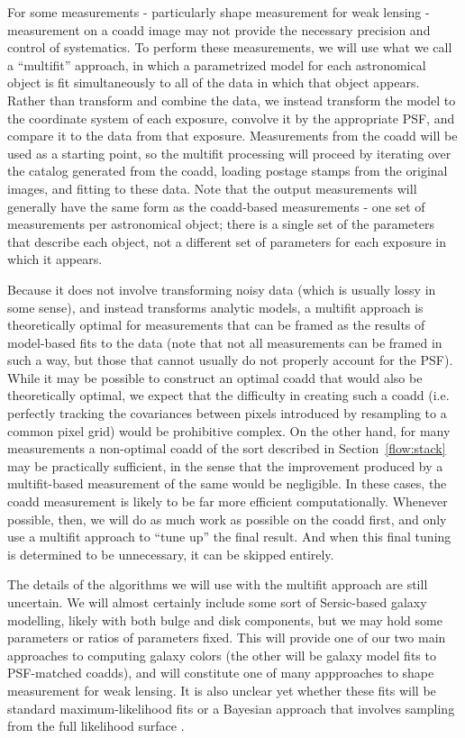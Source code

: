 \documentclass[12pt]{article}
\begin{document}
For some measurements - particularly shape measurement for weak
lensing - measurement on a coadd image may not provide the necessary
precision and control of systematics.  To perform these measurements,
we will use what we call a ``multifit'' approach, in which a
parametrized model for each astronomical object is fit simultaneously
to all of the data in which that object appears.  Rather than
transform and combine the data, we instead transform the model to the
coordinate system of each exposure, convolve it by the appropriate
PSF, and compare it to the data from that exposure.  Measurements from
the coadd will be used as a starting point, so the multifit processing
will proceed by iterating over the catalog generated from the coadd,
loading postage stamps from the original images, and fitting to these
data.  Note that the output measurements will generally have the same
form as the coadd-based measurements - one set of measurements per
astronomical object; there is a single set of the
parameters that describe each object, not a different set of parameters
for each exposure in which it appears.

Because it does not involve transforming noisy data (which is usually
lossy in some sense), and instead transforms analytic models, a
multifit approach is theoretically optimal for measurements that can
be framed as the results of model-based fits to the data (note that
not all measurements can be framed in such a way, but those that
cannot usually do not properly account for the PSF).  While it may be
possible to construct an optimal coadd that would also be
theoretically optimal, we expect that the difficulty in creating such
a coadd (i.e. perfectly tracking the covariances between pixels
introduced by resampling to a common pixel grid) would be prohibitive
complex.  On the other hand, for many measurements a non-optimal coadd
of the sort described in Section~\ref{flow:stack} may be practically
sufficient, in the sense that the improvement produced by a
multifit-based measurement of the same would be negligible.  In these
cases, the coadd measurement is likely to be far more efficient
computationally.  Whenever possible, then, we will do as much work as
possible on the coadd first, and only use a multifit approach to ``tune up''
the final result.  And when this final tuning is determined to be
unnecessary, it can be skipped entirely.

The details of the algorithms we will use with the multifit approach
are still uncertain.  We will almost certainly include some sort
of Sersic-based galaxy modelling, likely with both bulge and disk
components, but we may hold some parameters or ratios of parameters
fixed.  This will provide one of our two main approaches to
computing galaxy colors (the other will be galaxy model fits to
PSF-matched coadds), and will constitute one of many appproaches to
shape measurement for weak lensing.  It is also unclear yet whether
these fits will be standard maximum-likelihood fits or a Bayesian
approach that involves sampling from the full likelihood surface
\cite{BA2013,Miller2013}.
\end{document}

